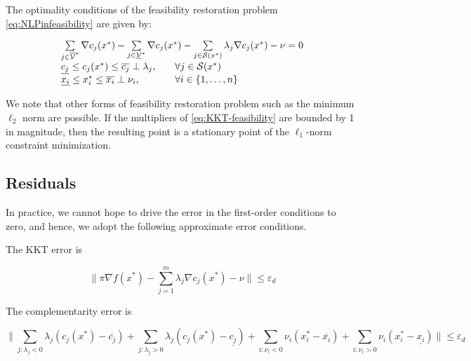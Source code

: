 The optimality conditions of the feasibility restoration problem \eqref{eq:NLPinfeasibility} are given by:

\begin{equation}\label{eq:KKT-infeasibility}
\begin{array}{ll}
\multicolumn{2}{l}{\sum\limits_{j \in \overline{\mathcal{V}}^*} \nabla c_j(x^*) - \sum\limits_{j \in \underline{\mathcal{V}}^*} \nabla c_j(x^*) - \sum\limits_{j \in \mathcal{S}(x^*)} \lambda_j \nabla c_j(x^*) - \nu = 0} \\ 
\underline{c_j} \le c_j(x^*) \le \overline{c_j} \perp \lambda_j, & \quad \forall j \in \mathcal{S}(x^*) \\
\underline{x_i} \le x^*_i \le \overline{x_i} \perp \nu_i, & \quad \forall i \in \{1, \ldots, n\}
\end{array}
\end{equation}

We note that other forms of feasibility restoration problem such as the minimum $\ell_2$ norm are possible. If the
multipliers of \eqref{eq:KKT-feasibility} are bounded by 1 in magnitude, then the resulting point is a stationary
point of the $\ell_1$-norm constraint minimization.

\subsection{Residuals}

In practice, we cannot hope to drive the error in the first-order conditions to zero, and hence, we adopt the
following approximate error conditions.

The KKT error is

\begin{equation}
\bigg\lVert \pi \nabla f(x^*) - \sum\limits_{j = 1}^m \lambda_j \nabla c_j(x^*) - \nu \bigg\rVert \le \varepsilon_d
\end{equation}

The complementarity error is

\begin{equation}
\bigg\lVert
\sum_{j: \lambda_j < 0} \lambda_j (c_j(x^*) - \overline{c_j}) +
\sum_{j: \lambda_j > 0} \lambda_j (c_j(x^*) - \underline{c_j}) +
\sum_{i: \nu_i < 0} \nu_i (x_i^* - \overline{x_i}) +
\sum_{i: \nu_i > 0} \nu_i (x_i^* - \underline{x_i})
\bigg\rVert \le \varepsilon_d
\end{equation}

